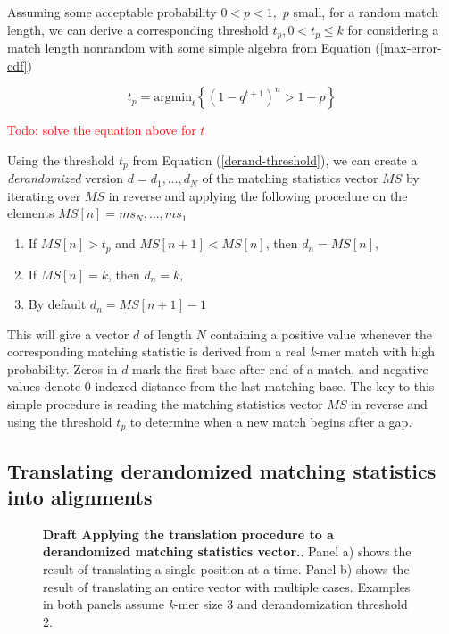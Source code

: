 \documentclass[unnumsec,webpdf,contemporary,large]{oup-authoring-template}%
\theoremstyle{thmstyleone}%
\theoremstyle{thmstyletwo}%
\theoremstyle{thmstylethree}%
\begin{document}
Assuming some acceptable probability $0 < p < 1,$ $p$ small, for a random match length, we can derive a corresponding threshold $t_p, 0 < t_p \leq k$ for considering a match length nonrandom with some simple algebra from Equation (\ref{max-error-cdf})

\begin{equation}
    t_p = \text{argmin}_t \left\{\left(1 - q^{t + 1}\right)^n > 1-p \right\}
\label{derand-threshold}
\end{equation}

\textcolor{red}{Todo: solve the equation above for $t$}

Using the threshold $t_p$ from Equation (\ref{derand-threshold}), we can create a \emph{derandomized} version $d = d_1, \dots, d_N$ of the matching statistics vector $MS$ by iterating over $MS$ in reverse and applying the following procedure on the elements $MS[n] = ms_N, \dots, ms_1$
\begin{enumerate}
\item If $MS[n] > t_p$ and $MS[n+1] < MS[n]$,  then $d_n = MS[n]$,
\item If $MS[n] = k$, then $d_n = k$,
\item By default $d_n = MS[n+1] - 1$
\end{enumerate}

This will give a vector $d$ of length $N$ containing a positive value whenever the corresponding matching statistic is derived from a real \emph{k}-mer match with high probability. Zeros in $d$ mark the first base after end of a match, and negative values denote 0-indexed distance from the last matching base. The key to this simple procedure is reading the matching statistics vector $MS$ in reverse and using the threshold $t_p$ to determine when a new match begins after a gap.

\subsection{Translating derandomized matching statistics into alignments}

\begin{figure}[!t]%
\centering
{}
\caption{\textbf{Draft Applying the translation procedure to a derandomized matching statistics vector.}. Panel a) shows the result of translating a single position at a time. Panel b) shows the result of translating an entire vector with multiple cases. Examples in both panels assume \emph{k}-mer size 3 and derandomization threshold 2.}\label{fig2}
\end{figure}
\end{document}
